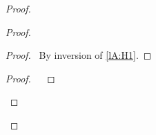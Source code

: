 \documentclass[a4paper]{article}
\begin{document}
\begin{proof}
    \begin{proof}
        \begin{proof}
            \pf\ By inversion of \ref{lA:H1}.
        \end{proof}
        \qedstep
        \begin{proof}
            \pf\ 
                        {\judge {\aContext}
                            {\aTerm[3]}
                            {\aType}}
                        {}
        \end{proof}
    \end{proof}
\end{proof}
\end{document}
